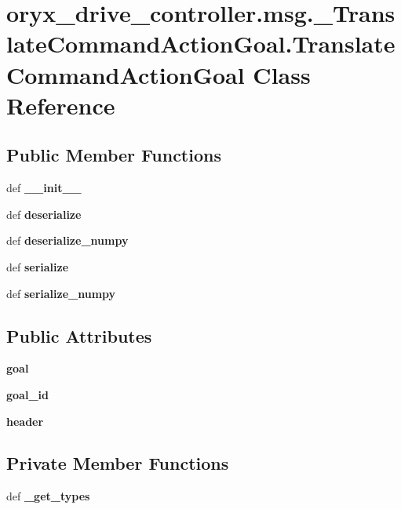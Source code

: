 \section{oryx\-\_\-drive\-\_\-controller.\-msg.\-\_\-\-Translate\-Command\-Action\-Goal.\-Translate\-Command\-Action\-Goal \-Class \-Reference}
\label{classoryx__drive__controller_1_1msg_1_1__TranslateCommandActionGoal_1_1TranslateCommandActionGoal}
\subsection*{\-Public \-Member \-Functions}
\begin{DoxyCompactItemize}
\item 
def {\bf \-\_\-\-\_\-init\-\_\-\-\_\-}
\item 
def {\bf deserialize}
\item 
def {\bf deserialize\-\_\-numpy}
\item 
def {\bf serialize}
\item 
def {\bf serialize\-\_\-numpy}
\end{DoxyCompactItemize}
\subsection*{\-Public \-Attributes}
\begin{DoxyCompactItemize}
\item 
{\bf goal}
\item 
{\bf goal\-\_\-id}
\item 
{\bf header}
\end{DoxyCompactItemize}
\subsection*{\-Private \-Member \-Functions}
\begin{DoxyCompactItemize}
\item 
def {\bf \-\_\-get\-\_\-types}
\end{DoxyCompactItemize}

